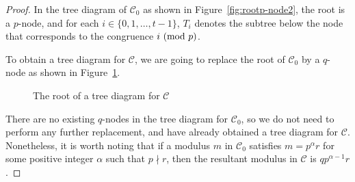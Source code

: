 \documentclass[12pt]{article}
\theoremstyle{definition}
\renewcommand{\i}{\textup{\textbf{i}}}
\renewcommand{\j}{\textup{\textbf{j}}}
\newcommand{\q}{\textup{\textbf{q}}}
\renewcommand{\mod}[2]{#1\textup{ (mod }#2\textup{)}}
\begin{document}
\begin{proof}
In the tree diagram of $\mathcal{C}_0$ as shown in Figure~\ref{fig:rootp-node2}, the root is a $p$-node, and for each $i\in\{0,1,\dotsc,t-1\}$, $T_i$ denotes the subtree below the node that corresponds to the congruence $\mod{i}{p}$.

To obtain a tree diagram for $\mathcal{C}$, we are going to replace the root of $\mathcal{C}_0$ by a $q$-node as shown in Figure~\ref{fig:rootq-node2}.
\begin{figure}[H]
\centering
{}
\caption{The root of a tree diagram for $\mathcal{C}$}
\label{fig:rootq-node2}
\end{figure}
\noindent There are no existing $q$-nodes in the tree diagram for $\mathcal{C}_0$, so we do not need to perform any further replacement, and have already obtained a tree diagram for $\mathcal{C}$. Nonetheless, it is worth noting that if a modulus $m$ in $\mathcal{C}_0$ satisfies $m=p^\alpha r$ for some positive integer $\alpha$ such that $p\nmid r$, then the resultant modulus in $\mathcal{C}$ is $qp^{\alpha-1}r$.
\end{proof}





\end{document}
